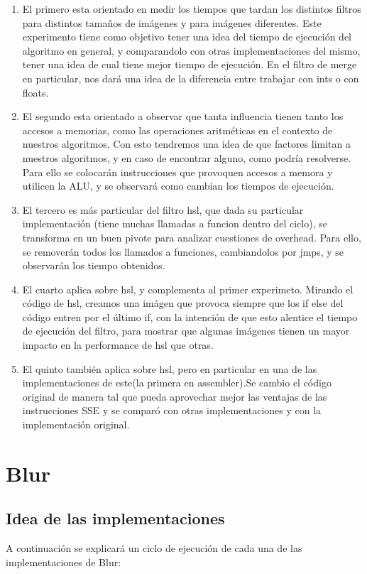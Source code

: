 \documentclass[a4paper]{article}
\begin{document}
\begin{enumerate}
	\item El primero esta orientado en medir los tiempos que tardan los distintos filtros para distintos tamaños de imágenes y para imágenes diferentes. Este experimento tiene como objetivo tener una idea del tiempo de ejecución del algoritmo en general, y comparandolo con otras implementaciones del mismo, tener una idea de cual tiene mejor tiempo de ejecución. En el filtro de merge en particular, nos dará una idea de la diferencia entre trabajar con ints o con floats.
	\item El segundo esta orientado a observar que tanta influencia tienen tanto los accesos a memorias, como las operaciones aritméticas en el contexto de nuestros algoritmos. Con esto tendremos una idea de que factores limitan a nuestros algoritmos, y en caso de encontrar alguno, como podría resolverse. Para ello se colocarán instrucciones que provoquen accesos a memora y utilicen la ALU, y se observará como cambian los tiempos de ejecución.
	\item El tercero es más particular del filtro hsl, que dada su particular implementación (tiene muchas llamadas a funcion dentro del ciclo), se transforma en un buen pivote para analizar cuestiones de overhead. Para ello, se removerán todos los llamados a funciones, cambiandolos por jmps, y se observarán los tiempo obtenidos.
	\item El cuarto aplica sobre hsl, y complementa al primer experimeto. Mirando el código de hsl, creamos una imágen que provoca siempre que los if else del código entren por el último if, con la intención de que esto alentice el tiempo de ejecución del filtro, para mostrar que algunas imágenes tienen un mayor impacto en la performance de hsl que otras.
	\item El quinto también aplica sobre hsl, pero en particular en una de las implementaciones de este(la primera en assembler).Se cambio el código original de manera tal que pueda aprovechar mejor las ventajas de las instrucciones SSE y se comparó con otras implementaciones y con la implementación original. 
\end{enumerate}

\newpage

\section{Blur}

\subsection{Idea de las implementaciones}
A continuación se explicará un ciclo de ejecución de cada una de las implementaciones de Blur:
\end{document}
